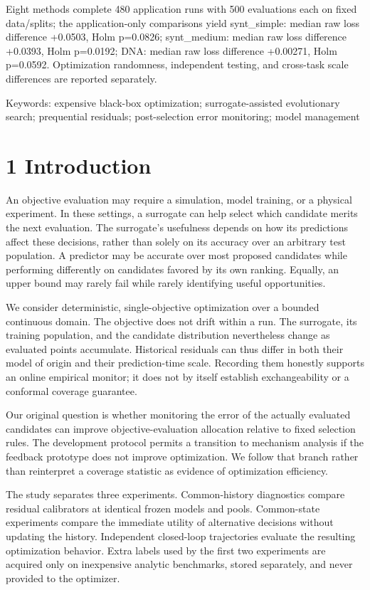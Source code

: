 \documentclass[11pt,a4paper]{article}
\begin{document}
Eight methods complete 480 application runs with 500 evaluations each on
fixed data/splits; the application-only comparisons yield synt\_simple:
median raw loss difference +0.0503, Holm p=0.0826; synt\_medium: median
raw loss difference +0.0393, Holm p=0.0192; DNA: median raw loss
difference +0.00271, Holm p=0.0592. Optimization randomness, independent
testing, and cross-task scale differences are reported separately.

Keywords: expensive black-box optimization; surrogate-assisted
evolutionary search; prequential residuals; post-selection error
monitoring; model management

\hypertarget{introduction}{%
\section{1 Introduction}\label{introduction}}

An objective evaluation may require a simulation, model training, or a
physical experiment. In these settings, a surrogate can help select
which candidate merits the next evaluation. The surrogate's usefulness
depends on how its predictions affect these decisions, rather than
solely on its accuracy over an arbitrary test population. A predictor
may be accurate over most proposed candidates while performing
differently on candidates favored by its own ranking. Equally, an upper
bound may rarely fail while rarely identifying useful opportunities.

We consider deterministic, single-objective optimization over a bounded
continuous domain. The objective does not drift within a run. The
surrogate, its training population, and the candidate distribution
nevertheless change as evaluated points accumulate. Historical residuals
can thus differ in both their model of origin and their prediction-time
scale. Recording them honestly supports an online empirical monitor; it
does not by itself establish exchangeability or a conformal coverage
guarantee.

Our original question is whether monitoring the error of the actually
evaluated candidates can improve objective-evaluation allocation
relative to fixed selection rules. The development protocol permits a
transition to mechanism analysis if the feedback prototype does not
improve optimization. We follow that branch rather than reinterpret a
coverage statistic as evidence of optimization efficiency.

The study separates three experiments. Common-history diagnostics
compare residual calibrators at identical frozen models and pools.
Common-state experiments compare the immediate utility of alternative
decisions without updating the history. Independent closed-loop
trajectories evaluate the resulting optimization behavior. Extra labels
used by the first two experiments are acquired only on inexpensive
analytic benchmarks, stored separately, and never provided to the
optimizer.
\end{document}
